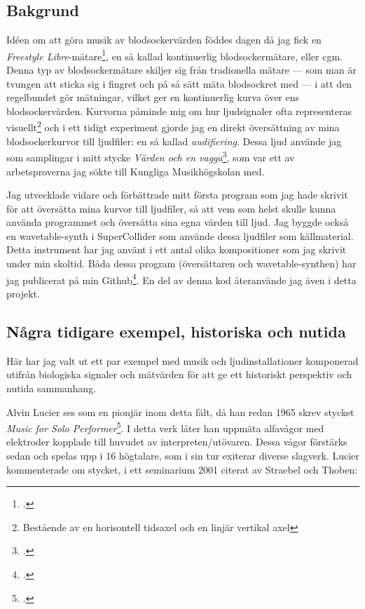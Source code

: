 \documentclass[11pt, a4paper]{article} %
\begin{document}
\subsection*{Bakgrund}
Idéen om att göra musik av blodsockervärden föddes dagen då jag fick en \emph{Freestyle Libre}-mätare\footcite{abbott_glukosovervakningssystem_nodate}, en så kallad kontinuerlig blodsockermätare, eller \gls{cgm}. Denna typ av blodsockermätare skiljer sig från tradionella mätare --- som man är tvungen att sticka sig i fingret och på så sätt mäta blodsockret med --- i att den regelbundet gör mätningar, vilket ger en kontinuerlig kurva över ens blodsockervärden.  Kurvorna påminde mig om hur ljudsignaler ofta representeras visuellt\footnote{Bestående av en horisontell tidsaxel och en linjär vertikal axel} och i ett tidigt experiment gjorde jag en direkt översättning av mina blodsockerkurvor till ljudfiler: en så kallad \emph{audifiering}. Dessa ljud använde jag som samplingar i mitt stycke \emph{Värden och en vagga}\footcite{jondell_varden_2017}, som var ett av arbetsproverna jag sökte till Kungliga Musikhögskolan med. 

Jag utvecklade vidare och förbättrade mitt första program som jag hade skrivit för att översätta mina kurvor till ljudfiler, så att vem som helst skulle kunna använda programmet och översätta sina egna värden till ljud. Jag byggde också en wavetable-synth i SuperCollider som använde dessa ljudfiler som källmaterial. Detta instrument har jag använt i ett antal olika kompositioner som jag skrivit under min skoltid. Båda dessa program (översättaren och wavetable-synthen) har jag publicerat på min Github\footcite{jondell_kj-jondelldiabetes-synth_2021}. En del av denna kod återanvände jag även i detta projekt.

\subsection*{Några tidigare exempel, historiska och nutida}
Här har jag valt ut ett par exempel med musik och ljudinstallationer komponerad utifrån biologiska signaler och mätvärden för att ge ett historiskt perspektiv och nutida sammanhang.

Alvin Lucier ses som en pionjär inom detta fält, då han redan 1965 skrev stycket \emph{Music for Solo Performer}\footcite{lucier_music_1965}. I detta verk låter han uppmäta alfavågor med elektroder kopplade till huvudet av interpreten/utövaren. Dessa vågor förstärks sedan och spelas upp i 16 högtalare, som i sin tur exiterar diverse slagverk. Lucier kommenterade om stycket, i ett seminarium 2001 citerat av Straebel och Thoben:
\end{document}
